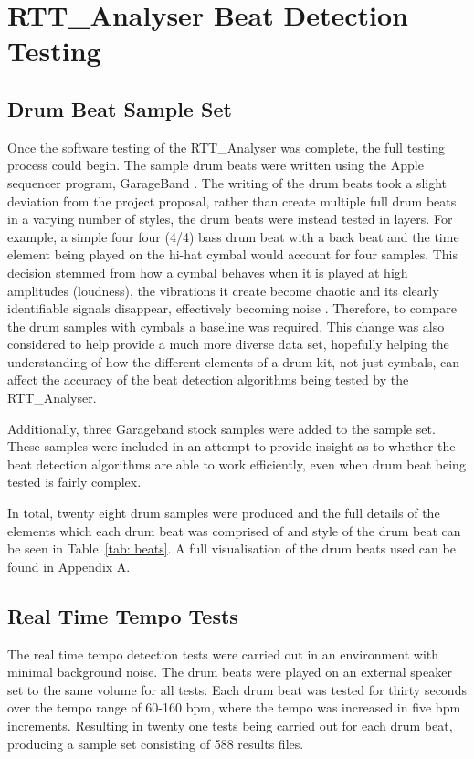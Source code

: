 \documentclass[a4paper, 11pt]{article}
\begin{document}
\maketitle{}\section{RTT\_Analyser Beat Detection Testing}
\subsection{Drum Beat Sample Set}
Once the software testing of the RTT\_Analyser was complete, the full testing process could begin. The sample drum beats were written using the Apple sequencer program, GarageBand \cite{garage}. The writing of the drum beats took a slight deviation from the project proposal, rather than create multiple full drum beats in a varying number of styles, the drum beats were instead tested in layers. For example, a simple four four (4/4) bass drum beat with a back beat and the time element being played on the hi-hat cymbal would account for four samples. This decision stemmed from how a cymbal behaves when it is played at high amplitudes (loudness), the vibrations it create become chaotic and its clearly identifiable signals disappear, effectively becoming noise \cite{soundonsound}. Therefore, to compare the drum samples with cymbals a baseline was required. This change was also considered to help provide a much more diverse data set, hopefully helping the understanding of how the different elements of a drum kit, not just cymbals, can affect the accuracy of the beat detection algorithms being tested by the RTT\_Analyser.\par

Additionally, three Garageband stock samples were added to the sample set. These samples were included in an attempt to provide insight as to whether the beat detection algorithms are able to work efficiently, even when drum beat being tested is fairly complex. 

In total, twenty eight drum samples were produced and the full details of the elements which each drum beat was comprised of and style of the drum beat can be seen in Table~\ref{tab: beats}. A full visualisation of the drum beats used can be found in Appendix A.

\subsection{Real Time Tempo Tests}
The real time tempo detection tests were carried out in an environment with minimal background noise. The drum beats were played on an external speaker set to the same volume for all tests. Each drum beat was tested for thirty seconds over the tempo range of 60-160 bpm, where the tempo was increased in five bpm increments. Resulting in twenty one tests being carried out for each drum beat, producing a sample set consisting of 588 results files.
\end{document}
